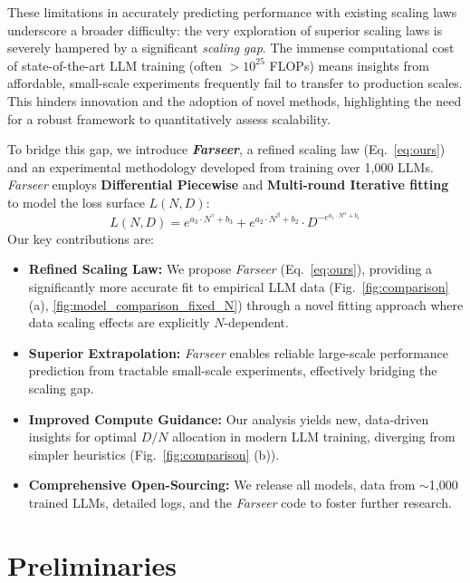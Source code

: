 \documentclass{article}
\begin{document}
These limitations in accurately predicting performance with existing scaling laws underscore a broader difficulty: the very exploration of superior scaling laws is severely hampered by a significant \emph{scaling gap}. 
The immense computational cost of state-of-the-art LLM training (often $>10^{25}$ FLOPs) means insights from affordable, small-scale experiments frequently fail to transfer to production scales. This hinders innovation and the adoption of novel methods, highlighting the need for a robust framework to quantitatively assess scalability.

To bridge this gap, we introduce \textit{\textbf{Farseer}}, a refined scaling law (Eq.~\ref{eq:ours}) and an experimental methodology developed from training over 1,000 LLMs. \textit{Farseer} employs \textbf{Differential Piecewise} and \textbf{Multi-round Iterative fitting} to model the loss surface $L(N,D)$:
\begin{equation}\label{eq:ours}
L(N, D) = e^{a_3 \cdot N^{\gamma} + b_3} + e^{a_2 \cdot N^{\beta} + b_2} \cdot D^{-e^{a_1 \cdot N^{\alpha} + b_1}}
\end{equation}
Our key contributions are:
\begin{itemize}
    \item \textbf{Refined Scaling Law:} We propose \textit{Farseer} (Eq.~\ref{eq:ours}), providing a significantly more accurate fit to empirical LLM data (Fig.~\ref{fig:comparison} (a), \ref{fig:model_comparison_fixed_N}) through a novel fitting approach where data scaling effects are explicitly $N$-dependent.
    \item \textbf{Superior Extrapolation:} \textit{Farseer} enables reliable large-scale performance prediction from tractable small-scale experiments, effectively bridging the scaling gap.
    \item \textbf{Improved Compute Guidance:} Our analysis yields new, data-driven insights for optimal $D/N$ allocation in modern LLM training, diverging from simpler heuristics (Fig.~\ref{fig:comparison} (b)).
    \item \textbf{Comprehensive Open-Sourcing:} We release all models, data from $\sim$1,000 trained LLMs, detailed logs, and the \textit{Farseer} code to foster further research.
\end{itemize}



\section{Preliminaries}
\end{document}
